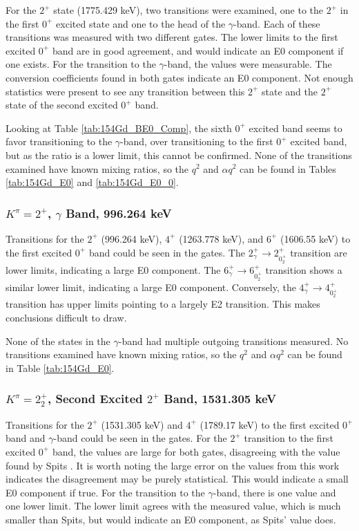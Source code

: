 For the $2^+$ state (1775.429 keV), two transitions were examined, one to the $2^+$ in the first $0^+$ excited state and one to the head of the $\gamma$-band. Each of these transitions was measured with two different gates. The lower limits to the first excited $0^+$ band are in good agreement, and would indicate an E0 component if one exists. For the transition to the $\gamma$-band, the values were measurable. The conversion coefficients found in both gates indicate an E0 component. Not enough statistics were present to see any transition between this $2^+$ state and the $2^+$ state of the second excited $0^+$ band.

Looking at Table \ref{tab:154Gd_BE0_Comp}, the sixth $0^+$ excited band seems to favor transitioning to the $\gamma$-band, over transitioning to the first $0^+$ excited band, but as the ratio is a lower limit, this cannot be confirmed. None of the transitions examined have known mixing ratios, so the $q^2$ and $\alpha q^2$ can be found in Tables \ref{tab:154Gd_E0} and \ref{tab:154Gd_E0_0}. 

\subsubsection{$K^{\pi}=2^+$, $\gamma$ Band, 996.264 keV}

Transitions for the $2^+$ (996.264 keV), $4^+$ (1263.778 keV), and $6^+$ (1606.55 keV) to the first excited $0^+$ band could be seen in the gates. The $2^+_{\gamma}\rightarrow 2^+_{0^+_2}$ transition are lower limits, indicating a large E0 component. The $6^+_{\gamma}\rightarrow 6^+_{0^+_2}$ transition shows a similar lower limit, indicating a large E0 component. Conversely, the $4^+_{\gamma}\rightarrow 4^+_{0^+_2}$ transition has upper limits pointing to a largely E2 transition. This makes conclusions difficult to draw.

None of the states in the $\gamma$-band had multiple outgoing transitions measured.  No transitions examined have known mixing ratios, so the $q^2$ and $\alpha q^2$ can be found in Table \ref{tab:154Gd_E0}. 

\subsubsection{$K^{\pi}=2^+_2$, Second Excited $2^+$ Band, 1531.305 keV}

Transitions for the $2^+$ (1531.305 keV) and $4^+$ (1789.17 keV) to the first excited $0^+$ band and $\gamma$-band could be seen in the gates. For the $2^+$ transition to the first excited $0^+$ band, the values are large for both gates, disagreeing with the value found by Spits \citep{spits96:_154gd}. It is worth noting the large error on the values from this work indicates the disagreement may be purely statistical. This would indicate a small E0 component if true. For the transition to the $\gamma$-band, there is one value and one lower limit. The lower limit agrees with the measured value, which is much smaller than Spits, but would indicate an E0 component, as Spits' value does.

